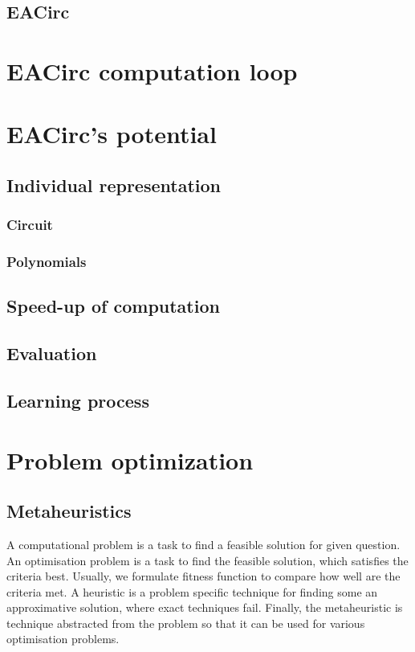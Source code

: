 \documentclass[
  print, %
  Table,   %
  nolof,     %
  nolot,     %
  11pt, %
  oneside  %
]{fithesis3}
\begin{document}
\subsection{EACirc}

\section{EACirc computation loop}

\section{EACirc's potential}

\subsection{Individual representation}

\subsubsection{Circuit}

\subsubsection{Polynomials}

\subsection{Speed-up of computation}

\subsection{Evaluation}

\subsection{Learning process}

\section{Problem optimization}

\subsection{Metaheuristics}

A computational problem is a task to find a feasible solution for given question. An optimisation problem is a task to find the feasible solution, which satisfies the criteria best. Usually, we formulate fitness function to compare how well are the criteria met. A heuristic is a problem specific technique for finding some an approximative solution, where exact techniques fail. Finally, the metaheuristic is technique abstracted from the problem so that it can be used for various optimisation problems.
\end{document}
